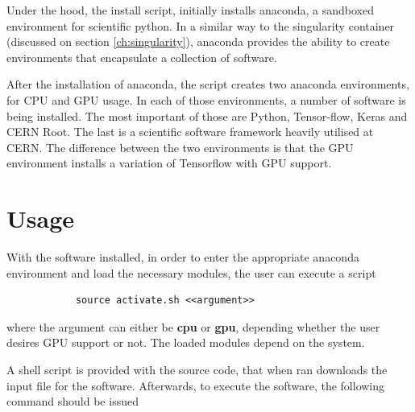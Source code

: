         Under the hood, the install script, initially installs anaconda, a sandboxed environment for scientific python. In a similar way to the singularity container (discussed on section \ref{ch:singularity}), anaconda provides the ability to create environments that encapsulate a collection of software. 
        
        After the installation of anaconda, the script creates two anaconda environments, for CPU and GPU usage. In each of those environments, a number of software is being installed. The most important of those are Python, Tensor-flow, Keras and CERN Root. The last is a scientific software framework heavily utilised at CERN. The difference between the two environments is that the GPU environment installs a variation of Tensorflow with GPU support. 
    


\section{Usage}\label{nnuse}
        With the software installed, in order to enter the appropriate anaconda environment and load the necessary modules, the user can execute a script
    \begin{lstlisting}
            source activate.sh <<argument>>\end{lstlisting}
        where the argument can either be \textbf{cpu} or \textbf{gpu}, depending whether the user desires GPU support or not. The loaded modules depend on the system.

        A shell script is provided with the source code, that when ran downloads the input file for the software. Afterwards, to execute the software, the following command should be issued
        
